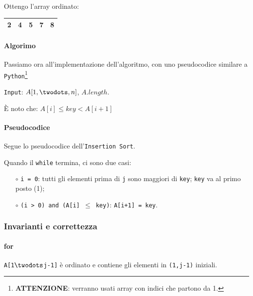 \smallskip
\noindent Ottengo l'array ordinato:

\begin{center}
	\begin{tabular}{|l|l|l|l|l|}
		\hline
		2 & 4 & 5 & 7 & 8 \\
		\hline
	\end{tabular}
\end{center}

\newpage

\paragraph{Algorimo} Passiamo ora all'implementazione dell'algoritmo, con uno pseudocodice similare a \texttt{Python}\footnote{\textbf{ATTENZIONE}: verranno usati array con indici
che partono da 1.}\par

\bigskip

\texttt{Input}: $A[1, \twodots ,n]$, $A.length$.

\begin{center}
	È noto che: 
	$A[i] \leq key < A[i+1]$
\end{center}

\paragraph{Pseudocodice} Segue lo pseudocodice dell'\texttt{Insertion Sort}.



\vspace{0.5cm}

Quando il \texttt{while} termina, ci sono due casi: 
\begin{itemize}
	\item[$\circ$] \texttt{i = 0}: tutti gli elementi prima di \texttt{j} 
	sono maggiori di \texttt{key}; \texttt{key} va al primo posto (1);
	\item[$\circ$] \texttt{(i > 0) and (A[i] $\leq$ key)}: \texttt{A[i+1] = key}.
\end{itemize}

\subsubsection{Invarianti e correttezza}

\paragraph{for} \texttt{A[1$\twodots$j-1]} è ordinato e contiene gli 
elementi in \texttt{(1,j-1)} iniziali.

